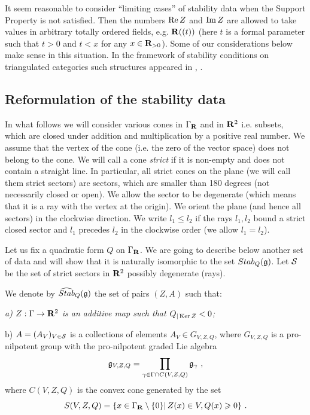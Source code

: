 \documentclass[12pt]{article}
\begin{document}
\begin{rmk} It seem reasonable to consider ``limiting cases'' of stability data when the Support Property is not satisfied. Then the numbers $\operatorname{Re}Z$ and $\operatorname{Im}Z$ are allowed to take values in arbitrary totally ordered fields, e.g. ${\bf R}((t))$ (here $t$ is a formal parameter such that $t>0$ and $t<x$ for any $x\in {\bf R}_{>0}$). Some of our considerations below make sense in this situation. In the framework of stability conditions on triangulated categories such structures appeared in \cite{Ba}, \cite{Tod1}.




\end{rmk}










\subsection{Reformulation of the stability data}

In what follows we will consider various cones in $\Gamma_{{\bf R}}$ and in ${\bf R}^2$ i.e. subsets, which are
closed under addition and multiplication by a positive real number. We assume that the vertex of the cone (i.e. the zero of the vector space)
does not belong to the cone. We will call a cone {\it strict}
if it is non-empty and does not contain a straight line. In particular, all strict cones on the plane (we will call them strict sectors) are sectors, which are
smaller than 180 degrees (not necessarily closed or open). We allow the sector to be degenerate (which means that it is a ray
with the vertex at the origin).
We orient the plane (and hence all sectors) in the clockwise direction. We write $l_1\le l_2$
if the rays $l_1,l_2$ bound a strict closed sector and $l_1$ precedes $l_2$ in the clockwise order (we allow
$l_1=l_2$).

Let us fix a quadratic form $Q$ on $\Gamma_{\bf R}$.
We are going to describe below another set of data and will show that it is naturally isomorphic to the
set $Stab_Q({\mathfrak g})$. Let ${\cal S}$ be the set of strict sectors in ${\bf R}^2$
possibly degenerate (rays).

We denote by $\widehat{Stab}_Q({\mathfrak g})$ the set of pairs $(Z, A)$ such that:

{\it a) $Z: \Gamma\to {\bf R}^2$ is an additive map such that
$Q_{|\operatorname{Ker}Z}<0$;



b) $A=(A_V)_{V\in {\cal S}}$ is a collections of elements $A_V\in G_{V,Z,Q}$, where
$G_{V,Z,Q}$ is a pro-nilpotent
group with the pro-nilpotent graded Lie algebra
$${\mathfrak g}_{V,Z,Q}=\prod_{\gamma\in\Gamma\cap C(V,Z,Q)}{\mathfrak g}_{\gamma}\,\,,$$
where $C(V,Z,Q)$ is the convex cone generated by the set
$$S(V,Z,Q)=\{x\in \Gamma_{{\bf R}}\setminus \{0\}|\, Z(x)\in V, Q(x)\geqslant 0\}\,\,.$$}
\end{document}
